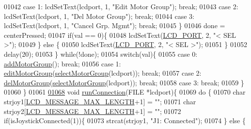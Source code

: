 \begin{DoxyCode}
{{{{{{{{{{{{{{01042             \textcolor{keywordflow}{case} 1: lcdSetText(lcdport, 1, \textcolor{stringliteral}{"Edit Motor Group"}); \textcolor{keywordflow}{break};
01043             \textcolor{keywordflow}{case} 2: lcdSetText(lcdport, 1, \textcolor{stringliteral}{"Del Motor Group"}); \textcolor{keywordflow}{break};
01044             \textcolor{keywordflow}{case} 3: lcdSetText(lcdport, 1, \textcolor{stringliteral}{"Cancel Grp. Mgmt"}); \textcolor{keywordflow}{break};
01045         \}
01046         done = centerPressed;
01047         \textcolor{keywordflow}{if}(val == 0)\{
01048             lcdSetText(\hyperlink{lcdmsg_8h_abcf42bd88b3c36193f301ca25b033875}{LCD\_PORT}, 2, \textcolor{stringliteral}{"<      SEL     >"});
01049         \} \textcolor{keywordflow}{else} \{
01050             lcdSetText(\hyperlink{lcdmsg_8h_abcf42bd88b3c36193f301ca25b033875}{LCD\_PORT}, 2, \textcolor{stringliteral}{"<      SEL     >"});
01051         \}
01052         delay(20);
01053     \} \textcolor{keywordflow}{while}(!done);
01054     \textcolor{keywordflow}{switch}(val)\{
01055         \textcolor{keywordflow}{case} 0: \hyperlink{lcddiag_8c_a9cffea5742f16bfef41b3dcf6d66cd7d}{addMotorGroup}(); \textcolor{keywordflow}{break};
01056         \textcolor{keywordflow}{case} 1: \hyperlink{lcddiag_8c_a8e26ee136d643c9e069d89be0e6b019e}{editMotorGroup}(\hyperlink{lcddiag_8c_a45205137e2aea6d387568cabe3072002}{selectMotorGroup}(lcdport)); \textcolor{keywordflow}{break};
01057         \textcolor{keywordflow}{case} 2: \hyperlink{lcddiag_8c_ac1782b34157c340fc8ae576a55d7d067}{delMotorGroup}(\hyperlink{lcddiag_8c_a45205137e2aea6d387568cabe3072002}{selectMotorGroup}(lcdport)); \textcolor{keywordflow}{break};
01058         \textcolor{keywordflow}{case} 3: \textcolor{keywordflow}{break};
01059     \}
01060 \}
01061 
\hypertarget{lcddiag_8c_source.tex_l01068}{}\hyperlink{lcddiag_8c_ae830c338f6de302a9719b9e7829d9897}{01068} \textcolor{keywordtype}{void} \hyperlink{lcddiag_8c_ae830c338f6de302a9719b9e7829d9897}{runConnection}(FILE *lcdport)\{
01069     \textcolor{keywordflow}{do} \{
01070         \textcolor{keywordtype}{char} strjoy1[\hyperlink{lcdmsg_8h_abe4c4b70fc6f44ae3680e5b2c68cdd00}{LCD\_MESSAGE\_MAX\_LENGTH}+1] = \textcolor{stringliteral}{""};
01071         \textcolor{keywordtype}{char} strjoy2[\hyperlink{lcdmsg_8h_abe4c4b70fc6f44ae3680e5b2c68cdd00}{LCD\_MESSAGE\_MAX\_LENGTH}+1] = \textcolor{stringliteral}{""};
01072         \textcolor{keywordflow}{if}(isJoystickConnected(1))\{
01073             strcat(strjoy1, \textcolor{stringliteral}{"J1: Connected"});
01074         \} \textcolor{keywordflow}{else} \{
}}}}}}}}}}}}}}
\end{DoxyCode}
